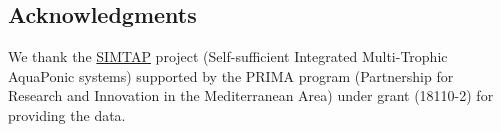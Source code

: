 \subsection{Acknowledgments}\label{acknowledgments}

We thank the \href{https://www.simtap.eu}{SIMTAP} project (Self-sufficient Integrated Multi-Trophic AquaPonic systems) supported by the PRIMA program (Partnership for Research and Innovation in the Mediterranean Area) under grant (18110-2) for providing the data.



\address{%
Gilles Durrieu\\
Univ Bretagne Sud, LMBA CNRS UMR 6205\\%
F-56000 Vannes, France\\
%
%
\textit{ORCiD: \href{https://orcid.org/0000-0003-0375-912X}{0000-0003-0375-912X}}\\%
\href{mailto:gilles.durrieu@univ-ubs.fr}{\nolinkurl{gilles.durrieu@univ-ubs.fr}}%
}

\address{%
Thomas Fillon\\
Univ Bretagne Sud, LMBA CNRS UMR 6205 \& IRISA CNRS UMR 6074\\%
F-56000 Vannes, France\\
%
%
\textit{ORCiD: \href{https://orcid.org/0000-0003-1207-8414}{0000-0003-1207-8414}}\\%
\href{mailto:thomas.fillon@univ-ubs.fr}{\nolinkurl{thomas.fillon@univ-ubs.fr}}%
}

\address{%
Tristan Senga Kiessé\\
INRAE, Institut Agro \& UMR 1069 SAS\\%
F-35000 Rennes, France\\
%
%
\textit{ORCiD: \href{https://orcid.org/0000-0003-2710-5825}{0000-0003-2710-5825}}\\%
\href{mailto:tristan.senga-kiesse@inrae.fr}{\nolinkurl{tristan.senga-kiesse@inrae.fr}}%
}
